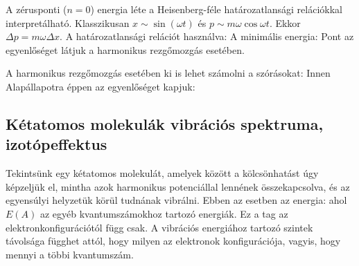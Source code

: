    A zérusponti ($n=0$) energia léte a Heisenberg-féle határozatlansági relációkkal interpretálható. Klasszikusan $x\sim\sin(\omega t)$ és $p\sim m\omega\cos\omega t$. Ekkor $\Delta p=m\omega \Delta x$. A határozatlansági relációt használva:
   A minimális energia:
   Pont az egyenlőséget látjuk a harmonikus rezgőmozgás esetében. 
   
   A harmonikus rezgőmozgás esetében ki is lehet számolni a szórásokat:
   Innen
   Alapállapotra éppen az egyenlőséget kapjuk:
   
  \subsection{Kétatomos molekulák vibrációs spektruma, izotópeffektus}
   
   Tekintsünk egy kétatomos molekulát, amelyek között a kölcsönhatást úgy képzeljük el, mintha azok harmonikus potenciállal lennének összekapcsolva, és az egyensúlyi helyzetük körül tudnának vibrálni. Ebben az esetben az energia:
   ahol $E(A)$ az egyéb kvantumszámokhoz tartozó energiák. Ez a tag az elektronkonfigurációtól függ csak. A vibrációs energiához tartozó szintek távolsága függhet attól, hogy milyen az elektronok konfigurációja, vagyis, hogy mennyi a többi kvantumszám. 
   
